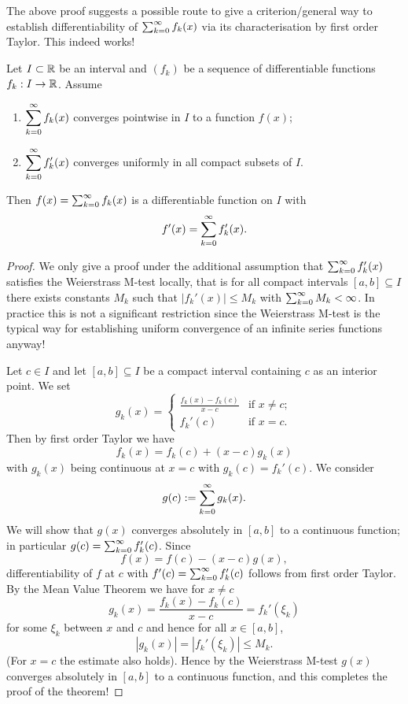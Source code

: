 \documentclass[10pt, a4paper]{article}
\begin{document}
The above proof suggests a possible route to give a criterion/general way to establish differentiability of $\sum_{k = 0}^{\infty} f_k(x)$ via its characterisation by first order Taylor.
This indeed works!

\begin{theorem}\label{pre:analy:thm:convserofseqdifffuncs}
    Let $I \subset \mathbb{R}$ be an interval and $(f_k)$ be a sequence of differentiable functions $f_k : I \rightarrow \mathbb{R}$.
    Assume
    \begin{enumerate}[label = (\roman*)]
        \item $\displaystyle\sum_{k = 0}^{\infty} f_k(x)$ converges pointwise in $I$ to a function $f(x)$;
        \item $\displaystyle\sum_{k = 0}^{\infty} f_k'(x)$ converges uniformly in all compact subsets of $I$.
    \end{enumerate}
    Then $f(x) = \sum_{k = 0}^{\infty} f_k(x)$ is a differentiable function on $I$ with
    \[
    f'(x) = \sum_{k = 0}^{\infty} f_k'(x).
    \]
    \begin{proof}
        We only give a proof under the additional assumption that $\sum_{k = 0}^{\infty} f_k'(x)$ satisfies the Weierstrass M-test locally,
        that is for all compact intervals $[a, b] \subseteq I$ there exists constants $M_k$ such that $|f_k'(x)| \leq M_k$ with $\sum_{k = 0}^{\infty} M_k < \infty$.
        In practice this is not a significant restriction since the Weierstrass M-test is the typical way for establishing uniform convergence of an infinite series functions anyway!

        Let $c \in I$ and let $[a, b] \subseteq I$ be a compact interval containing $c$ as an interior point.
        We set
        \[
        g_k(x) = \begin{cases}
            \frac{f_k(x) - f_k(c)}{x - c} & \text{if } x \neq c; \\
            f_k'(c) & \text{if } x = c.
        \end{cases}
        \]
        Then by first order Taylor we have
        \[
        f_k(x) = f_k(c) + (x - c)g_k(x)
        \]
        with $g_k(x)$ being continuous at $x = c$ with $g_k(c) = f_k'(c)$.
        We consider
        \[
        g(c) := \sum_{k = 0}^{\infty} g_k(x).
        \]
        We will show that $g(x)$ converges absolutely in $[a, b]$ to a continuous function;
        in particular $g(c) = \sum_{k = 0}^{\infty} f_k'(c)$.
        Since
        \[
        f(x) = f(c) - (x - c)g(x),
        \]
        differentiability of $f$ at $c$ with $f'(c) = \sum_{k = 0}^{\infty} f_k'(c)$ follows from first order Taylor.
        By the Mean Value Theorem we have for $x \neq c$
        \[
        g_k(x) = \frac{f_k(x) - f_k(c)}{x - c} = f_k'(\xi_k)
        \]
        for some $\xi_k$ between $x$ and $c$ and hence for all $x \in [a, b]$,
        \[
        |g_k(x)| = |f_k'(\xi_k)| \leq M_k.
        \]
        (For $x = c$ the estimate also holds).
        Hence by the Weierstrass M-test $g(x)$ converges absolutely in $[a, b]$ to a continuous function,
        and this completes the proof of the theorem!
    \end{proof}
\end{theorem}
\end{document}
